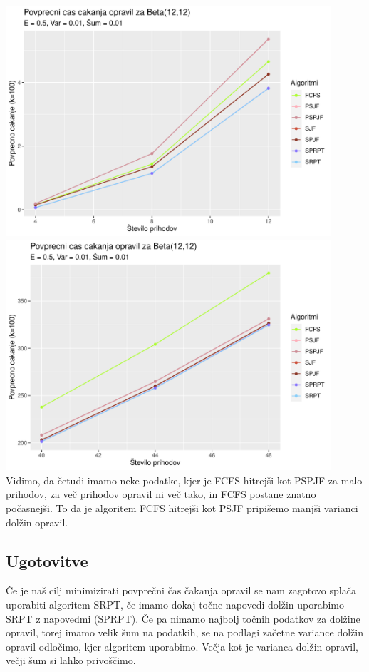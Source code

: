 \documentclass[a4paper, pt14]{article}
\begin{document}
\includegraphics[width=12.1cm,keepaspectratio]{Beta_grafi_razclenitev1.pdf}
\includegraphics[width=12.1cm,keepaspectratio]{Beta_grafi_razclenitev2.pdf}
\\Vidimo, da četudi imamo neke podatke, kjer je FCFS hitrejši kot PSPJF za malo prihodov, za več prihodov opravil ni več tako, in FCFS postane znatno počasnejši. To da je algoritem FCFS hitrejši kot PSJF pripišemo manjši varianci dolžin opravil.

\subsection{Ugotovitve}
Če je naš cilj minimizirati povprečni čas čakanja opravil se nam zagotovo splača uporabiti algoritem SRPT, če imamo dokaj točne napovedi dolžin uporabimo SRPT z napovedmi (SPRPT). Če pa nimamo najbolj točnih podatkov za dolžine opravil, torej imamo velik šum na podatkih, se na podlagi začetne variance dolžin opravil odločimo, kjer algoritem uporabimo. Večja kot je varianca dolžin opravil, večji šum si lahko privoščimo.
 
\end{document}
